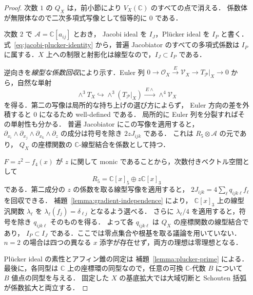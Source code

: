 \begin{proof}
次数 $1$ の $Q_X$ は，前小節により $V_X(\mathbb C)$ のすべての点で消える．
係数体が無限体なので二次多項式写像として恒等的に $0$ である．

次数 $2$ で $\mathcal A=\mathbb C[a_{ij}]$ とおき，
Jacobi ideal を $I_J$，Pl\"ucker ideal を $I_P$ と書く．
式~\eqref{eq:jacobi-plucker-identity} から，普遍 Jacobiator のすべての多項式係数は
$I_P$ に属する．$X$ 上への制限と射影化は線型なので，$I_J\subset I_P$ である．

逆向きを\emph{線型な係数回収}により示す．Euler 列
$0\to\mathcal O_X\xrightarrow E\mathcal V_X\to T_{\mathcal P}|_X\to0$
から，自然な単射
\begin{equation}
 \wedge^3T_X\hookrightarrow\wedge^3(T_{\mathcal P}|_X)
 \xrightarrow{\ E\wedge\ }\wedge^4\mathcal V_X
 \label{eq:euler-jacobi-injection}
\end{equation}
を得る．第二の写像は局所的な持ち上げの選び方によらず，
Euler 方向の差を外積すると $0$ になるため well-defined である．
局所的に Euler 列を分裂すればその単射性も分かる．
普遍 Jacobiator にこの写像を適用すると，
$\partial_{x_i}\wedge\partial_{x_j}\wedge\partial_{x_k}\wedge\partial_z$
の成分は符号を除き $2zJ_{ijk}$ である．
これは $R_5\otimes\mathcal A$ の元であり，
$Q_X$ の座標関数の $\mathbb C$-線型結合を係数として持つ．

$F=z^2-f_4(x)$ が $z$ に関して monic であることから，次数付きベクトル空間として
\begin{equation}
 R_5=\mathbb C[x]_5\oplus z\mathbb C[x]_3
 \label{eq:degree-five-splitting}
\end{equation}
である．第二成分の $z$ の係数を取る線型写像を適用すると，
$2J_{ijk}=4\sum_\ell q_{ijk\ell}f_\ell$ を回収できる．
補題~\ref{lemma:gradient-independence} により，
$\mathbb C[x]_3$ 上の線型汎関数 $\lambda_\ell$ を
$\lambda_\ell(f_j)=\delta_{\ell j}$ となるよう選べる．
さらに $\lambda_\ell/4$ を適用すると，符号を除き $q_{ijk\ell}$ そのものを得る．
よって各 $q_{ijk\ell}$ は $Q_X$ の座標関数の線型結合であり，
$I_P\subset I_J$ である．ここでは零点集合や根基を取る議論を用いていない．
$n=2$ の場合は四つの異なる $x$ 添字が存在せず，両方の理想は零理想となる．

Pl\"ucker ideal の素性とアフィン錐の同定は
補題~\ref{lemma:plucker-prime} による．
最後に，各同型は $\mathbb C$ 上の座標環の同型なので，任意の可換
$\mathbb C$-代数 $B$ について $B$ 値点の同型を与える．
固定した $X$ の基底拡大では大域切断と Schouten 括弧が係数拡大と両立する．
\end{proof}

